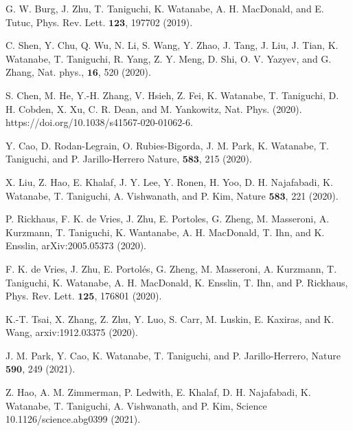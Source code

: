 \documentclass[showpacs,aps,prb,reprint,twocolumn]{revtex4-1}
\begin{document}
\begin{thebibliography}{99}
 G. W. Burg, J. Zhu, T. Taniguchi, K. Watanabe, A. H. MacDonald, and E. Tutuc, Phys. Rev. Lett. $\mathbf{123}$, 197702 (2019). 

 C. Shen, Y. Chu, Q. Wu, N. Li, S. Wang, Y. Zhao, J. Tang, J. Liu, J. Tian, K. Watanabe, T. Taniguchi, R. Yang, Z. Y. Meng, D. Shi, O. V. Yazyev, and G. Zhang, Nat. phys.,  $\mathbf{16}$, 520 (2020). 

 S. Chen, M. He, Y.-H. Zhang, V. Hsieh, Z. Fei, K. Watanabe, T. Taniguchi, D. H. Cobden, X. Xu, C. R. Dean, and M. Yankowitz, Nat. Phys. (2020). https://doi.org/10.1038/s41567-020-01062-6.

 Y. Cao, D. Rodan-Legrain, O. Rubies-Bigorda, J. M. Park, K. Watanabe, T. Taniguchi, and P. Jarillo-Herrero 
Nature, $\mathbf{583}$, 215 (2020). 

 X. Liu, Z. Hao, E. Khalaf, J. Y. Lee, Y. Ronen, H. Yoo, D. H. Najafabadi, K. Watanabe, T. Taniguchi, A. Vishwanath, and P. Kim, Nature $\mathbf{583}$, 221 (2020).


 P. Rickhaus, F. K. de Vries, J. Zhu, E. Portoles, G. Zheng, M. Masseroni, A. Kurzmann, T. Taniguchi, K. Wantanabe, A. H. MacDonald, T. Ihn, and K. Ensslin, arXiv:2005.05373 (2020). 

 F. K. de Vries, J. Zhu, E. Portolés, G. Zheng, M. Masseroni, A. Kurzmann, T. Taniguchi, K. Watanabe, A. H. MacDonald, K. Ensslin, T. Ihn, and P. Rickhaus,
Phys. Rev. Lett. $\mathbf{125}$, 176801 (2020). 

 K.-T. Tsai, X. Zhang, Z. Zhu, Y. Luo, S. Carr, M. Luskin, E. Kaxiras, and K. Wang, arxiv:1912.03375 (2020). 

 J. M. Park, Y. Cao, K. Watanabe, T. Taniguchi, and P. Jarillo-Herrero, Nature $\mathbf{590}$, 249 (2021). 

 Z. Hao, A. M. Zimmerman, P. Ledwith, E. Khalaf, D. H. Najafabadi, K. Watanabe, T. Taniguchi, A. Vishwanath, and P. Kim, Science 10.1126/science.abg0399 (2021).




\end{thebibliography}
\end{document}
